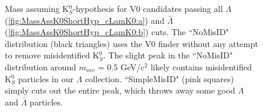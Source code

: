 \documentclass[../AnalysisNoteJBuxton.tex]{subfiles}
\begin{document}
\begin{figure}[h!]
  \centering
  \caption[K$^{0}_{S}$ contamination in $\Lambda$($\bar{\Lambda}$) collection]{Mass assuming K$^{0}_{S}$-hypothesis for V0 candidates passing all $\Lambda$ (\ref{fig:MassAssK0ShortHyp_cLamK0:a}) and $\bar{\Lambda}$ (\ref{fig:MassAssK0ShortHyp_cLamK0:b}) cuts.
  The ``NoMisID" distribution (black triangles) uses the V0 finder without any attempt to remove misidentified K$^{0}_{S}$.
  The slight peak in the ``NoMisID" distribution around $m_{inv}$ = 0.5 GeV/c$^{2}$ likely contains misidentified K$^{0}_{S}$ particles in our $\Lambda$ collection.  
  ``SimpleMisID" (pink squares) simply cuts out the entire peak, which throws away some good $\Lambda$ and $\bar{\Lambda}$ particles.
}
\end{figure}
\end{document}
